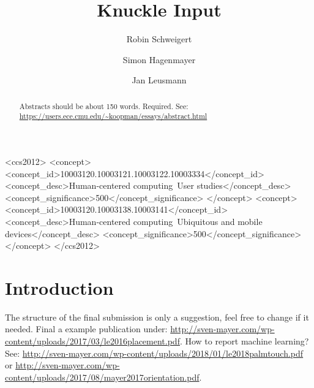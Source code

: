 \documentclass[sigchi-a, authorversion]{acmart}
\begin{document}
\title{Knuckle Input}

\author{Robin Schweigert}

\author{Simon Hagenmayer}

\author{Jan Leusmann}


\renewcommand{\shortauthors}{F. Author et al.}


%
%


\begin{CCSXML}
<ccs2012>
 <concept>
<concept_id>10003120.10003121.10003122.10003334</concept_id>
<concept_desc>Human-centered computing~User studies</concept_desc>
<concept_significance>500</concept_significance>
</concept>
<concept>
<concept_id>10003120.10003138.10003141</concept_id>
<concept_desc>Human-centered computing~Ubiquitous and mobile devices</concept_desc>
<concept_significance>500</concept_significance>
</concept>
</ccs2012>
\end{CCSXML}



\begin{abstract}
Abstracts should be about 150 words. Required. See: \url{https://users.ece.cmu.edu/~koopman/essays/abstract.html}
\end{abstract}



\maketitle

\section{Introduction}
The structure of the final submission is only a suggestion, feel free to change if it needed. Final a example publication under: \url{http://sven-mayer.com/wp-content/uploads/2017/03/le2016placement.pdf}. How to report machine learning? See: \url{http://sven-mayer.com/wp-content/uploads/2018/01/le2018palmtouch.pdf} or \url{http://sven-mayer.com/wp-content/uploads/2017/08/mayer2017orientation.pdf}.
\end{document}
